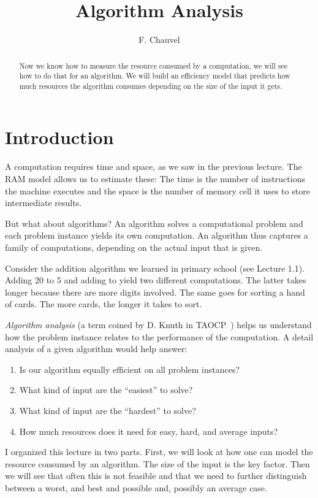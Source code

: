 \documentclass{aldast}
\title{Algorithm Analysis}
\author{F. Chauvel}
\begin{document}
\maketitle

\begin{abstract}
  Now we know how to measure the resource consumed by a
  computation, we will see how to do that for an algorithm. We will
  build an efficiency model that predicts how much resources the
  algorithm consumes depending on the size of the input it gets. 
\end{abstract}

\section*{Introduction}

A computation requires time and space, as we saw in the previous
lecture. The RAM model allows us to estimate these: The time is the
number of instructions the machine executes and the space is the
number of memory cell it uses to store intermediate results.

But what about algorithms? An algorithm solves a computational problem
and each problem instance yields its own computation. An algorithm
thus captures a family of computations, depending on the actual input
that is given.

Consider the addition algorithm we learned in primary school (see
Lecture 1.1). Adding 20 to 5 and adding  to
 yield two different computations. The latter takes
longer because there are more digits involved. The same goes for
sorting a hand of cards. The more cards, the longer it takes to sort.

\emph{Algorithm analysis} (a term coined by D. Knuth in
TAOCP~\cite{knuth1978}) helps us understand how the problem instance
relates to the performance of the computation. A detail analysis of a
given algorithm would help answer:
\begin{enumerate}
\item Is our algorithm equally efficient on all problem instances?
\item What kind of input are the ``easiest'' to solve?
\item What kind of input are the ``hardest'' to solve?
\item How much resources does it need for easy, hard, and average inputs?
\end{enumerate}

I organized this lecture in two parts. First, we will look at how one
can model the resource consumed by an algorithm. The size of the
input is the key factor. Then we will see that often this is not
feasible and that we need to further distinguish between a worst, and
best and possible and, possibly an average case.
\end{document}
